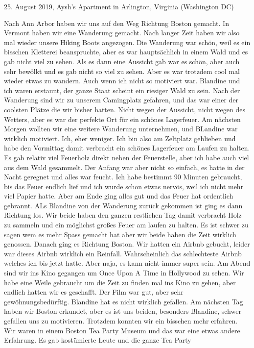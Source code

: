 \documentclass[11pt]{book}
\begin{document}
25. August 2019, Aysh's Apartment in Arlington, Virginia (Washington DC)

Nach Ann Arbor haben wir uns auf den Weg Richtung Boston gemacht. In Vermont haben wir eine Wanderung gemacht. Nach langer Zeit haben wir also mal wieder 
unsere Hiking Boots angezogen. Die Wanderung war schön, weil es ein bisschen Kletterei beanspruchte, aber es war hauptsächlich in einem Wald und es gab nicht 
viel zu sehen. Als es dann eine Aussicht gab war es schön, aber auch sehr bewölkt und es gab nicht so viel zu sehen. Aber es war trotzdem cool mal wieder 
etwas zu wandern. Auch wenn ich nicht so motiviert war. Blandine und ich waren erstaunt, der ganze Staat scheint ein riesiger Wald zu sein. Nach der 
Wanderung sind wir zu unserem Camingplatz gefahren, und das war einer der coolsten Plätze die wir bisher hatten. Nicht wegen der Aussicht, nicht wegen des Wetters, 
aber es war der perfekte Ort für ein schönes Lagerfeuer. Am nächsten Morgen wollten wir eine weitere Wanderung unternehmen, und BLandine war wirklich motiviert. Ich, eher
weniger. Ich bin also am Zeltplatz geblieben und habe den Vormittag damit verbracht ein schönes Lagerfeuer am Laufen zu halten. Es gab relativ viel Feuerholz 
direkt neben der Feuerstelle, aber ich habe auch viel aus dem Wald gesammelt. Der Anfang war aber nicht so einfach, es hatte in der Nacht geregnet und alles war 
feucht. Ich habe bestimmt 90 Minuten gebraucht, bis das Feuer endlich lief und ich wurde schon etwas nervös, weil ich nicht mehr viel Papier hatte. Aber am Ende 
ging alles gut und das Feuer hat ordentlich gebrannt. ALs Blandine von der Wanderung zurück gekommen ist ging es dann Richtung los. Wir beide haben den ganzen 
restlichen Tag damit verbracht Holz zu sammeln und ein möglichst großes Feuer am laufen zu halten. Es ist schwer zu sagen wem es mehr Spass gemacht hat aber wir 
beide haben die Zeit wirklich genossen. 
Danach ging es Richtung Boston. Wir hatten ein Airbnb gebucht, leider war dieses Airbnb wirklich ein Reinfall. Wahrscheinlich das schlechteste Airbnb welches 
ich bis jetzt hatte. Aber naja, es kann nicht immer super sein. Am Abend sind wir ins Kino gegangen um Once Upon A Time in Hollywood zu sehen. Wir habe eine 
Weile gebraucht um die Zeit zu finden mal ins Kino zu gehen, aber endlich hatten wir es geschafft. Der Film war gut, aber sehr gewöhnungsbedürftig. Blandine hat 
es nicht wirklich gefallen. Am nächsten Tag haben wir Boston erkundet, aber es ist uns beiden, besonders Blandine, schwer gefallen uns zu motivieren. Trotzdem konnten 
wir ein bisschen mehr erfahren. Wir waren in einem Boston Tea Party Museum und das war eine etwas andere Erfahrung. Es gab kostümierte Leute und die ganze Tea Party
\end{document}
